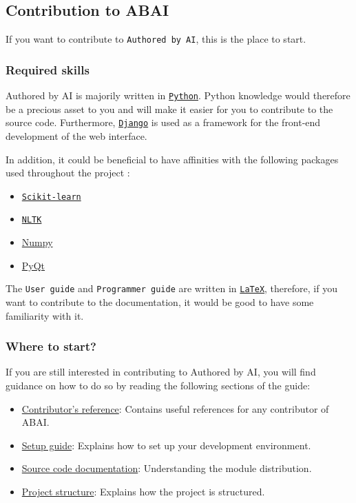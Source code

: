 \subsection{Contribution to ABAI}
If you want to contribute to \texttt{Authored by AI}, this is the place to start.

\subsubsection{Required skills}

Authored by AI is majorily written in \href{https://www.python.org/}{\texttt{Python}}. Python knowledge would therefore be a precious asset to you and will make it easier for you to contribute to the source code. Furthermore, \href{https://www.djangoproject.com/}{\texttt{Django}} is used as a framework for the front-end development of the web interface.

In addition, it could be beneficial to have affinities with the following packages used throughout the project :
\begin{itemize}
    \item \href{https://scikit-learn.org/stable/}{\texttt{Scikit-learn}}
    \item \href{https://www.nltk.org/index.html}{\texttt{NLTK}}
    \item \href{https://numpy.org/}{Numpy}
    \item \href{https://www.riverbankcomputing.com/software/pyqt/intro}{PyQt}
\end{itemize}

The \texttt{User guide} and \texttt{Programmer guide} are written in \href{https://www.latex-project.org/}{\texttt{LaTeX}}, therefore, if you want to contribute to the documentation, it would be good to have some familiarity with it.

\subsubsection{Where to start?}
If you are still interested in contributing to Authored by AI, you will find guidance on how to do so by reading the following sections of the guide: 
\begin{itemize}
    \item \hyperref[sec:contributors-reference]{Contributor's reference}: Contains useful references for any contributor of ABAI. 
    \item \hyperref[sec:setup-guide]{Setup guide}: Explains how to set up your development environment.
    \item \hyperref[sec:source-code-documentation]{Source code documentation}: Understanding the module distribution. 
    \item \hyperref[subsec:project-structure]{Project structure}: Explains how the project is structured.
\end{itemize}



